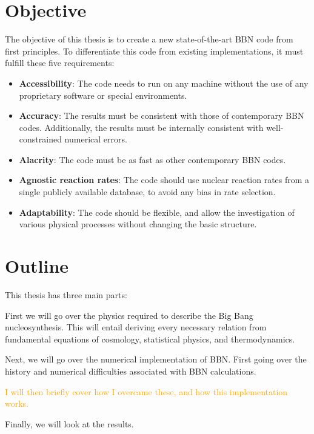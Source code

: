 \section{Objective} 
The objective of this thesis is to create a new state-of-the-art BBN code from first principles. To differentiate this code from existing implementations, it must fulfill these five requirements:

\begin{itemize}
    \item \textbf{Accessibility}: The code needs to run on any machine without the use of any proprietary software or special environments. %
    \item \textbf{Accuracy}: The results must be consistent with those of contemporary BBN codes. Additionally, the results must be internally consistent with well-constrained numerical errors. 
    \item \textbf{Alacrity}: The code must be as fast as other contemporary BBN codes.
    \item \textbf{Agnostic reaction rates}: The code should use nuclear reaction rates from a single publicly available database, to avoid any bias in rate selection.
    \item \textbf{Adaptability}: The code should be flexible, and allow the investigation of various physical processes without changing the basic structure.
\end{itemize}

\section{Outline}

This thesis has three main parts:

\noindent First we will go over the physics required to describe the Big Bang nucleosynthesis. This will entail deriving every necessary relation from fundamental equations of cosmology, statistical physics, and thermodynamics. 

\noindent Next, we will go over the numerical implementation of BBN. First going over the history and numerical difficulties associated with BBN calculations. 

\textcolor{orange}{I will then briefly cover how I overcame these, and how this implementation works.}

\noindent Finally, we will look at the results. 

